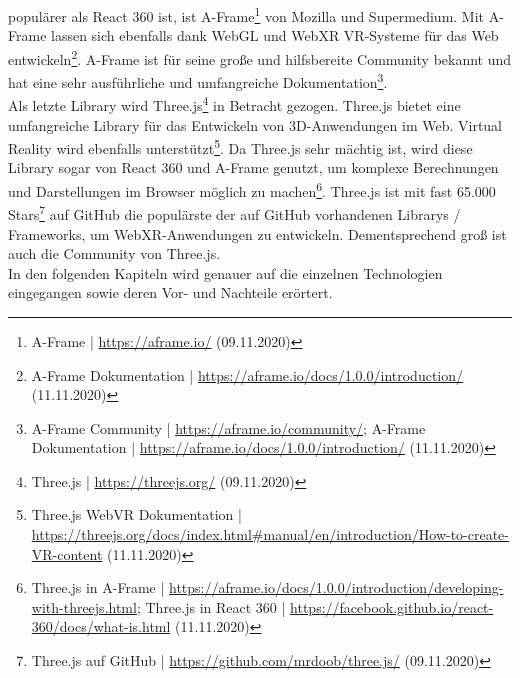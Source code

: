 \documentclass[a4paper,12pt,oneside]{article}
\begin{document}
      populärer als React 360 ist, ist A-Frame\footnote{A-Frame | \url{https://aframe.io/} (09.11.2020)}
      von Mozilla und Supermedium. Mit A-Frame lassen sich ebenfalls dank
      WebGL und WebXR VR-Systeme für das Web entwickeln\footnote{A-Frame Dokumentation | \url{https://aframe.io/docs/1.0.0/introduction/} (11.11.2020)}.
      A-Frame ist für seine große und
      hilfsbereite Community bekannt und hat eine sehr ausführliche und umfangreiche
      Dokumentation\footnote{A-Frame Community | \url{https://aframe.io/community/}; A-Frame Dokumentation | \url{https://aframe.io/docs/1.0.0/introduction/} (11.11.2020)}. \\
      Als letzte Library wird Three.js\footnote{Three.js | \url{https://threejs.org/} (09.11.2020)}
      in Betracht gezogen. Three.js bietet eine umfangreiche
      Library für das Entwickeln von 3D-Anwendungen im Web. Virtual Reality wird ebenfalls
      unterstützt\footnote{Three.js WebVR Dokumentation | \url{https://threejs.org/docs/index.html\#manual/en/introduction/How-to-create-VR-content} (11.11.2020)}.
      Da Three.js sehr mächtig ist, wird diese Library sogar von React 360
      und A-Frame genutzt, um komplexe Berechnungen und Darstellungen 
      im Browser möglich zu machen\footnote{Three.js in A-Frame | \url{https://aframe.io/docs/1.0.0/introduction/developing-with-threejs.html}; Three.js in React 360 | \url{https://facebook.github.io/react-360/docs/what-is.html} (11.11.2020)}.
      Three.js ist mit fast 65.000 Stars\footnote{Three.js auf GitHub | \url{https://github.com/mrdoob/three.js/} (09.11.2020)}
      auf GitHub die populärste der auf GitHub 
      vorhandenen Librarys / Frameworks, um WebXR-Anwendungen zu entwickeln. 
      Dementsprechend groß ist auch die Community von Three.js. \\
      In den folgenden Kapiteln wird genauer auf die einzelnen Technologien 
      eingegangen sowie deren Vor- und Nachteile erörtert.
\end{document}
